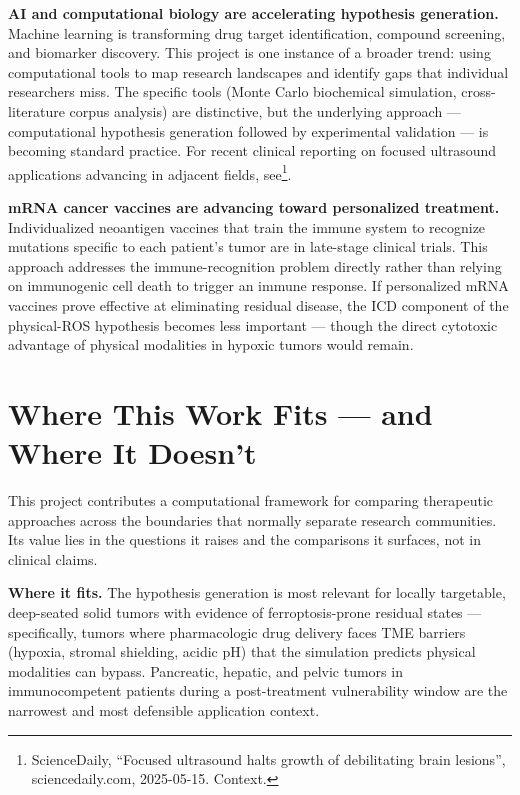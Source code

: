 \documentclass[11pt,twoside,openright]{report}
\begin{document}
\textbf{AI and computational biology are accelerating hypothesis generation.} Machine learning is transforming drug target identification, compound screening, and biomarker discovery. This project is one instance of a broader trend: using computational tools to map research landscapes and identify gaps that individual researchers miss. The specific tools (Monte Carlo biochemical simulation, cross-literature corpus analysis) are distinctive, but the underlying approach --- computational hypothesis generation followed by experimental validation --- is becoming standard practice. For recent clinical reporting on focused ultrasound applications advancing in adjacent fields, see\footnote{ScienceDaily, ``Focused ultrasound halts growth of debilitating brain lesions'', sciencedaily.com, 2025-05-15. Context.}.

\textbf{mRNA cancer vaccines are advancing toward personalized treatment.} Individualized neoantigen vaccines that train the immune system to recognize mutations specific to each patient's tumor are in late-stage clinical trials. This approach addresses the immune-recognition problem directly rather than relying on immunogenic cell death to trigger an immune response. If personalized mRNA vaccines prove effective at eliminating residual disease, the ICD component of the physical-ROS hypothesis becomes less important --- though the direct cytotoxic advantage of physical modalities in hypoxic tumors would remain.

\section{Where This Work Fits --- and Where It Doesn't}

This project contributes a computational framework for comparing therapeutic approaches across the boundaries that normally separate research communities. Its value lies in the questions it raises and the comparisons it surfaces, not in clinical claims.

\textbf{Where it fits.} The hypothesis generation is most relevant for locally targetable, deep-seated solid tumors with evidence of ferroptosis-prone residual states --- specifically, tumors where pharmacologic drug delivery faces TME barriers (hypoxia, stromal shielding, acidic pH) that the simulation predicts physical modalities can bypass. Pancreatic, hepatic, and pelvic tumors in immunocompetent patients during a post-treatment vulnerability window are the narrowest and most defensible application context.
\end{document}
